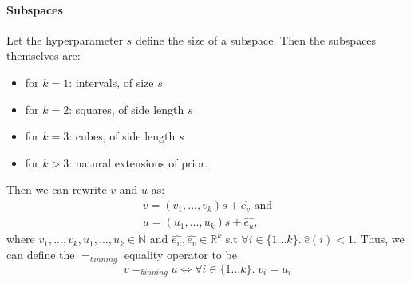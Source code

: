 \documentclass[dissertation.tex]{subfiles}
\begin{document}
\paragraph{Subspaces} Let the hyperparameter $s$ define the size of a subspace.
Then the subspaces themselves are:
\begin{itemize}
  \item{
      for $k=1$: intervals, of size $s$
    }
  \item{
      for $k=2$: squares, of side length $s$
    }
  \item{
      for $k=3$: cubes, of side length $s$
    }
  \item{
      for $k>3$: natural extensions of prior.          }
\end{itemize}
Then we can rewrite $v$ and $u$ as:
\begin{gather}
  v=(v_1,...,v_k)s+\hat{e_v}
  \text{ and}\\
  u=(u_1,...,u_k)s+\hat{e_u},
\end{gather}
where $v_1,...,v_k,u_1,...,u_k\in\mathbb{N}$
and $\hat{e_u},\hat{e_v}\in\mathbb{R}^k$ s.t
$\forall{i}\in{\{1...k\}}.\;\hat{e}(i)<1$. Thus, we can define the $=_{binning}$
equality operator to be
\begin{equation}
  v=_{binning}u
  \Leftrightarrow 
  \forall{i}\in{\{1...k\}}.\;v_i=u_i
\end{equation}
\end{document}
